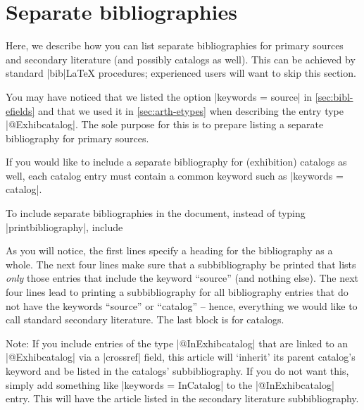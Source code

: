 \documentclass[a4paper,
10pt,
ngerman,
english
]{ltxdoc}
\begin{document}
\section{Separate bibliographies}\label{sec:sepbib}
Here, we describe how you can list separate bibliographies for primary sources and secondary literature (and possibly catalogs as well). This can be achieved by standard |bib|\LaTeX{} procedures; experienced users will want to skip this section.

You may have noticed that we listed the option |keywords = {source}| in \cref{sec:bibl-efields} and that we used it in \cref{sec:arth-etypes} when describing the entry type |@Exhibcatalog|. The sole purpose for this is to prepare listing a separate bibliography for primary sources.

If you would like to include a separate bibliography for (exhibition) catalogs as well, each catalog entry must contain a common keyword such as |keywords = {catalog}|.

To include separate bibliographies in the document, instead of typing |printbibliography|, include
\begin{code}
\printbibheading[%
  heading=bibliography,%
  title={Bibliography}]
\printbibliography[%
  keyword=source,%
  heading=subbibliography,
  title={Primary sources}]
\printbibliography[%
  notkeyword=catalog,%
  notkeyword=source,%
  heading=subbibliography,%
  title={Secondary literature}]
\printbibliography[%
  keyword=catalog,%
  heading=subbibliography,%
  title={Exhibition catalogs}]
\end{code}
As you will notice, the first lines specify a heading for the bibliography as a whole. The next four lines make sure that a subbibliography be printed that lists \emph{only} those entries that include the keyword \enquote{source} (and nothing else). The next four lines lead to printing a subbibliography for all bibliography entries that do not have the keywords \enquote{source} or \enquote{catalog} -- hence, everything we would like to call standard secondary literature. The last block is for catalogs.

Note: If you include entries of the type |@InExhibcatalog| that are linked to an |@Exhibcatalog| via a |crossref| field, this article will \enquote*{inherit} its parent catalog's keyword and be listed in the catalogs' subbibliography. 
If you do not want this, simply add something like |keywords = {InCatalog}| to the |@InExhibcatalog| entry. 
This will have the article listed in the secondary literature subbibliography.
\end{document}

